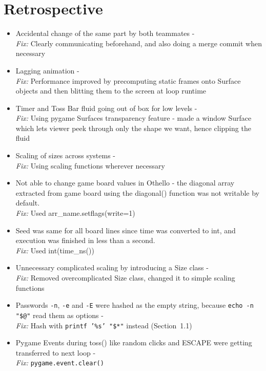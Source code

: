 \documentclass[12pt]{article}
\begin{document}
\section{Retrospective}
\begin{itemize}
    \item Accidental change of the same part by both teammates - \\
    \emph{Fix:} Clearly communicating beforehand, and also doing a merge commit when necessary
    \item Lagging animation - \\
    \emph{Fix:} Performance improved by precomputing static frames onto Surface objects and then blitting them to the screen at loop runtime \cite{pygame_surface}
    \item Timer and Toss Bar fluid going out of box for low levels - \\
    \emph{Fix:} Using pygame Surfaces transparency feature - made a window Surface \\ which lets viewer peek through only the shape we want, hence clipping the fluid \cite{pygame_transparency}
    \item Scaling of sizes across systems - \\
    \emph{Fix:} Using scaling functions wherever necessary
    \item Not able to change game board values in Othello - the diagonal array extracted from game board using the diagonal() function was not writable by default.\\
    \emph{Fix:} Used arr\_name.setflags(write=1) \cite{numpy_setflags}
    \item Seed was same for all board lines since time was converted to int, and execution was finished in less than a second. \\
    \emph{Fix:} Used int(time\_ns())
    \item Unnecessary complicated scaling by introducing a Size class - \\
    \emph{Fix:} Removed overcomplicated Size class, changed it to simple scaling functions 
    \item Passwords \texttt{-n}, \texttt{-e} and \texttt{-E} were hashed as the empty string, because \texttt{echo -n "\$@"} read them as options - \\
    \emph{Fix:} Hash with \texttt{printf '\%s' "\$*"} instead (Section~1.1) \cite{bash_builtins}
	\item Pygame Events during toss() like random clicks and ESCAPE were getting transferred to next loop - \\
    \emph{Fix:} \texttt{pygame.event.clear()}
\end{itemize}
\end{document}
